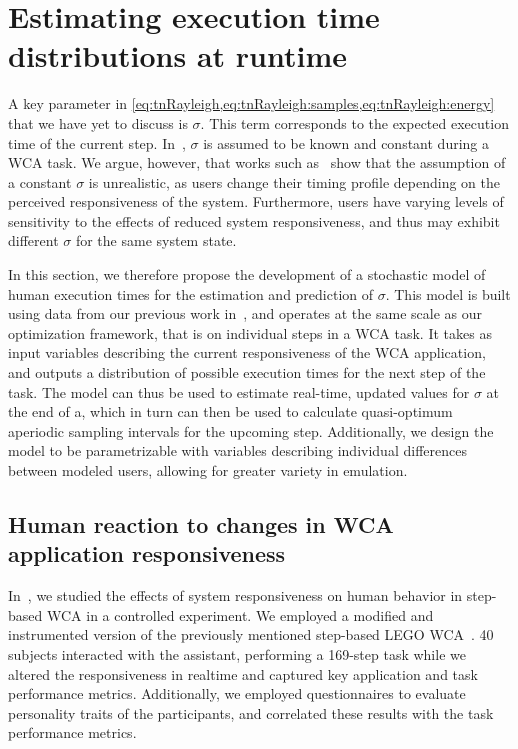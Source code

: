 \section{Estimating execution time distributions at runtime}\label{sec:model}

A key parameter in \cref{eq:tnRayleigh,eq:tnRayleigh:samples,eq:tnRayleigh:energy} that we have yet to discuss is \ensuremath{\sigma}.
This term corresponds to the expected execution time of the current step.
In~\cite{moothedath2021energy,moothedath2022energy1,moothedath2022energy2}, \ensuremath{\sigma} is assumed to be known and constant during a \gls{WCA} task.
We argue, however, that works such as~\cite{olguinmunoz2021impact} show that the assumption of a constant \ensuremath{\sigma} is unrealistic, as users change their timing profile depending on the perceived responsiveness of the system.
Furthermore, users have varying levels of sensitivity to the effects of reduced system responsiveness, and thus may exhibit different \ensuremath{\sigma} for the same system state.

In this section, we therefore propose the development of a stochastic model of human execution times for the estimation and prediction of \ensuremath{\sigma}.
This model is built using data from our previous work in~\cite{olguinmunoz2021impact}, and operates at the same scale as our optimization framework, that is on individual steps in a \gls{WCA} task.
It takes as input variables describing the current responsiveness of the \gls{WCA} application, and outputs a distribution of possible execution times for the next step of the task.
The model can thus be used to estimate real-time, updated values for \ensuremath{\sigma} at the end of a, which in turn can then be used to calculate quasi-optimum aperiodic sampling intervals for the upcoming step.
Additionally, we design the model to be parametrizable with variables describing individual differences between modeled users, allowing for greater variety in emulation.

\subsection{Human reaction to changes in \gls{WCA} application responsiveness}\label{sec:model:insights}

In~\cite{olguinmunoz2021impact}, we studied the effects of system responsiveness on human behavior in step-based \gls{WCA} in a controlled experiment.
We employed a modified and instrumented version of the previously mentioned step-based LEGO \gls{WCA}~\cite{chen2015early}.
\num{40} subjects interacted with the assistant, performing a \num{169}-step task while we altered the responsiveness in realtime and captured key application and task performance metrics.
Additionally, we employed questionnaires to evaluate personality traits of the participants, and correlated these results with the task performance metrics.

